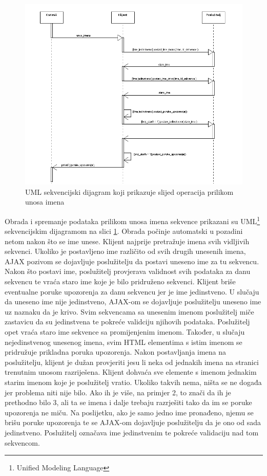 \begin{figure}[h!]
\centering
\includegraphics[width=5.3in]{figures/Unos_imena.png}
\caption{UML sekvencijski dijagram koji prikazuje slijed operacija prilikom
unosa imena}
\label{fig:imena}
\end{figure}

Obrada i spremanje podataka prilikom unosa imena sekvence prikazani su
UML\footnote{Unified Modeling Language} sekvencijskim dijagramom na slici
\ref{fig:imena}. Obrada počinje automatski u pozadini netom nakon što se ime
unese. Klijent najprije pretražuje imena svih vidljivih sekvenci. Ukoliko je
postavljeno ime različito od svih drugih unesenih imena, AJAX pozivom se
dojavljuje poslužitelju da postavi uneseno ime za tu sekvencu. Nakon što postavi
ime, poslužitelj provjerava validnost svih podataka za danu sekvencu te vraća
staro ime koje je bilo pridruženo sekvenci. Klijent briše eventualne poruke
upozorenja za danu sekvencu jer je ime jedinstveno. U slučaju da uneseno ime
nije jedinstveno, AJAX-om se dojavljuje poslužitelju uneseno ime uz naznaku da
je krivo. Svim sekvencama sa unesenim imenom poslužitelj miče zastavicu da su
jedinstvena te pokreće validciju njihovih podataka. Poslužitelj opet vraća staro
ime sekvence sa promijenjenim imenom. Također, u slučaju nejedinstvenog unesenog
imena, svim HTML elementima s istim imenom se pridružuje prikladna poruka
upozorenja. Nakon postavljanja imena na poslužitelju, klijent je dužan
provjeriti jesu li neka od jednakih imena na stranici trenutnim unosom
razriješena. Klijent dohvaća sve elemente s imenom jednakim starim imenom koje
je poslužitelj vratio. Ukoliko takvih nema, ništa se ne događa jer problema niti
nije bilo. Ako ih je više, na primjer 2, to znači da ih je prethodno bilo 3, ali
ta se imena i dalje trebaju razrješiti tako da im se poruke upozorenja ne miču.
Na poslijetku, ako je samo jedno ime pronađeno, njemu se brišu poruke upozorenja
te se AJAX-om dojavljuje poslužitelju da je ono od sada jedinstveno. Poslužitelj
označava ime jedinstvenim te pokreće validaciju nad tom sekvencom.

